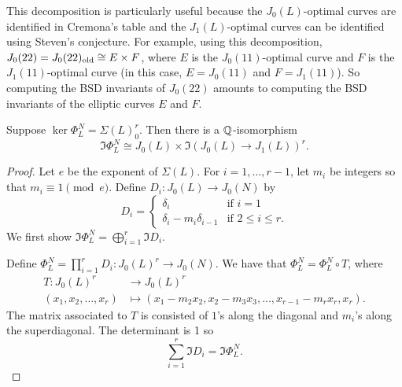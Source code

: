 \documentclass[11pt, proquest]{uwthesis}
\begin{document}
This decomposition is particularly useful because the $J_0(L)$-optimal curves
are identified in Cremona's table and the $J_1(L)$-optimal curves can be
identified using Steven's conjecture. For example, using this decomposition,
$J_0(22) = J_0(22)_{\mathrm{old}} \cong E\times F$, where $E$ is the $J_0(11)$-optimal
curve and $F$ is the $J_1(11)$-optimal curve (in this case, $E=J_0(11)$ and
$F=J_1(11)$). So computing the BSD invariants of $J_0(22)$ amounts to computing
the BSD invariants of the elliptic curves $E$ and $F$.

\begin{proposition}
    \label{prop:decomp}
    Suppose $\ker\Phi_L ^N=\Sigma(L)_0 ^r$. Then there is a $\mathbb{Q}$-isomorphism
    \[
        \Im\Phi_L ^N \cong J_0(L)\times \Im(J_0(L)\to J_1(L))^r.
    \]
\end{proposition}
\begin{proof}
    Let $e$ be the exponent of $\Sigma(L)$. For $i=1,\ldots,r-1$, let $m_i$ be
    integers so that $m_i \equiv 1 \pmod{e}$. Define $D_i:J_0(L)\to J_0(N)$ by
    \[
        D_i =
        \begin{cases}
            \delta_i                    & \text{if } i = 1\\
            \delta_i - m_i \delta_{i-1} & \text{if } 2\leq i \leq r.
        \end{cases}
    \]
    We first show $\Im\Phi_L ^N = \bigoplus_{i=1} ^r \Im D_i$.

    Define $\Phi_L ^N =\prod_{i=1} ^r D_i : J_0(L)^r \to J_0(N)$. We have that
    $\Phi_L ^N = \Phi_L ^N \circ T$, where
    \begin{align*}
        T:J_0(L)^r & \to J_0(L)^r \\
        (x_1,x_2,\ldots,x_r)&\mapsto (x_1-m_2x_2,x_2-m_3 x_3,\ldots,x_{r-1}-m_r
        x_r, x_r).
    \end{align*}
    The matrix associated to $T$ is consisted of $1$'s along the diagonal and
    $m_i$'s along the superdiagonal. The determinant is 1 so
    \[
        \sum_{i=1} ^r \Im D_i = \Im \Phi_L ^N.
    \]


\end{proof}
\end{document}
